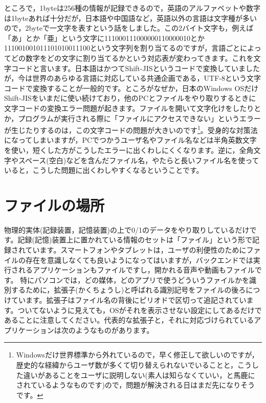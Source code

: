 \documentclass{ltjsbook}
\begin{document}
ところで，1byteは256種の情報が記録できるので，英語のアルファベットや数字は1byteあれば十分だが，日本語や中国語など，英語以外の言語は文字種が多いので，2byteで一文字を表すという話をしました。この2バイト文字も，例えば「あ」とか「亜」という文字に111000111000000110000010とか111001001011101010011100という文字列を割り当てるのですが，言語ごとによってどの数字をどの文字に割り当てるかという対応表が変わってきます。これを文字コードと言います。日本語はかつてShift-JISというコードで変換していましたが，今は世界のあらゆる言語に対応している共通企画である，UTF-8という文字コードで変換することが一般的です。ところがなぜか，日本のWindows OSだけShift-JISをいまだに使い続けており，他のPCとファイルをやり取りするときに文字コードの変換エラー問題が起きます。ファイルを開いて文字化けをしたりとか，プログラムが実行される際に「ファイルにアクセスできない」というエラーが生じたりするのは，この文字コードの問題が大きいのです\footnote{Windowsだけ世界標準から外れているので，早く修正して欲しいのですが，歴史的な経緯からユーザ数が多くて切り替えられないでいることと，こうした違いがあることをユーザに説明しない(素人は知らなくていい，と馬鹿にされているようなものです)ので，問題が解決される日はまだ先になりそうです。}。受身的な対策法になってしまいますが，PCでつかうユーザ名やファイル名などは半角英数文字を使い，短くした方がこうしたエラーに出くわしにくくなります。逆に，全角文字やスペース(空白)などを含んだファイル名，やたらと長いファイル名を使っていると，こうした問題に出くわしやすくなるということです。


\section{ファイルの場所}

物理的実体(記録装置，記憶装置)の上で0/1のデータをやり取りしているだけです。記録(記憶)装置上に置かれている情報のセットは「ファイル」という形で記録されています。スマートフォンやタブレットは，ユーザの利便性のためにファイルの存在を意識しなくても良いようになってはいますが，バックエンドでは実行されるアプリケーションもファイルですし，開かれる音声や動画もファイルです。
特にパソコンでは，どの媒体，どのアプリで使うどういうファイルかを識別するために，拡張子(かくちょうし)と呼ばれる識別記号をファイルの後ろにつけています。拡張子はファイル名の背後にピリオドで区切って追記されています。ついてないように見えても，OSがそれを表示させない設定にしてあるだけであることに注意してください。代表的な拡張子と，それに対応づけられているアプリケーションは次のようなものがあります。
\end{document}
